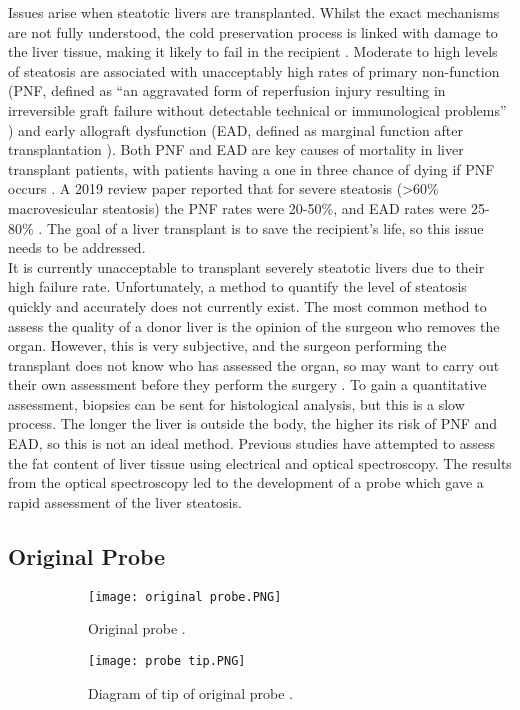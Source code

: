 Issues arise when steatotic livers are transplanted. Whilst the exact mechanisms are not fully understood, the cold preservation process is linked with damage to the liver tissue, making it likely to fail in the recipient \cite{Imber2002}. Moderate to high levels of steatosis are associated with unacceptably high rates of primary non-function (PNF, defined as “an aggravated form of reperfusion injury resulting in irreversible graft failure without detectable technical or immunological problems” \cite{Lock2010}) and early allograft dysfunction (EAD, defined as marginal function after transplantation \cite{Deschenes2013}). Both PNF and EAD are key causes of mortality in liver transplant patients, with patients having a one in three chance of dying if PNF occurs \cite{Robertson}. A 2019 review paper reported that for severe steatosis (\textgreater60\% macrovesicular steatosis) the PNF rates were 20-50\%, and EAD rates were 25-80\% \cite{Linares2019}. The goal of a liver transplant is to save the recipient’s life, so this issue needs to be addressed.\\

It is currently unacceptable to transplant severely steatotic livers due to their high failure rate. Unfortunately, a method to quantify the level of steatosis quickly and accurately does not currently exist. The most common method to assess the quality of a donor liver is the opinion of the surgeon who removes the organ. However, this is very subjective, and the surgeon performing the transplant does not know who has assessed the organ, so may want to carry out their own assessment before they perform the surgery \cite{Robertson}. To gain a quantitative assessment, biopsies can be sent for histological analysis, but this is a slow process. The longer the liver is outside the body, the higher its risk of PNF and EAD, so this is not an ideal method. Previous studies \cite{McLaughlin2010} have attempted to assess the fat content of liver tissue using electrical and optical spectroscopy. The results from the optical spectroscopy led to the development of a probe \cite{Robertson} which gave a rapid assessment of the liver steatosis. \\


\subsection{Original Probe}

\begin{figure}[htbp]
	\centering
	\begin{subfigure}[b]{0.4\linewidth}
		\texttt{[image: original probe.PNG]}
		\caption{Original probe \cite{Robertson}.}
		\label{fig: original probe}
	\end{subfigure}
	\begin{subfigure}[b]{0.4\linewidth}
		\texttt{[image: probe tip.PNG]}
		\caption{Diagram of tip of original probe \cite{Robertson}.}
		\label{fig: probe tip}
	\end{subfigure}
	\caption{}
\end{figure}


